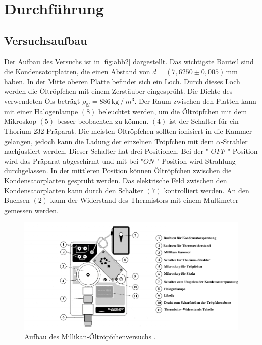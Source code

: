 \section{Durchführung}
\label{sec:Durchführung}

\subsection{Versuchsaufbau}
Der Aufbau des Versuchs ist in \autoref{fig:abb2} dargestellt. Das wichtigste Bauteil sind die Kondensatorplatten, die einen Abstand von $d = (7,6250 \pm 0,005) \, \unit{\milli\meter}$ haben.
In der Mitte oberen Platte befindet sich ein Loch. Durch dieses Loch werden die Öltröpfchen mit einem Zerstäuber eingesprüht.
Die Dichte des verwendeten Öls beträgt $\rho_{öl} = 886 \, \unit{\kilo\gram} \mathbin{/} m^3$. Der Raum zwischen den Platten kann mit einer Halogenlampe $(8)$ beleuchtet werden, um die Öltröpfchen mit dem Mikroskop $(5)$ besser beobachten zu können.
$(4)$ ist der Schalter für ein Thorium-232 Prä­pa­rat. Die meisten Öltröpfchen sollten ionisiert in die Kammer gelangen, jedoch kann die Ladung der einzelnen Tröpfchen mit dem $\alpha$-Strahler nachjustiert werden. Dieser Schalter hat drei Positionen.
Bei der " $OFF$ " Position wird das Prä­pa­rat abgeschirmt und mit bei "$ON$ " Position wird Strahlung durchgelassen. In der mittleren Position können Öltröpfchen zwischen die Kondensatorplatten gesprüht werden.
Das elektrische Feld zwischen den Kondensatorplatten kann durch den Schalter $(7)$ kontrolliert werden.
An den Buchsen $(2)$ kann der Widerstand des Thermistors mit einem Multimeter gemessen werden.


\begin{figure}[H]
    \centering
    \includegraphics[width=1.0\textwidth]{figures/Abb2.pdf}
    \caption{Aufbau des Millikan-Öltröpfchenversuchs \cite{ap12}.}
    \label{fig:abb2}
\end{figure}

